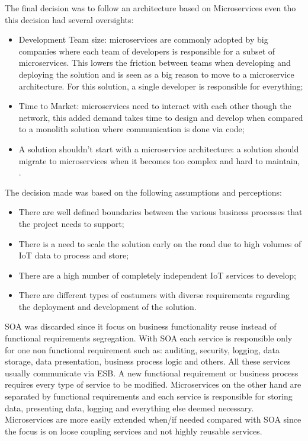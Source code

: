 The final decision was to follow an architecture based on Microservices even tho this decision had several oversights:

\begin{itemize}
   \item Development Team size: microservices are commonly adopted by big companies where each team of developers is responsible for a subset of microservices. This lowers the friction between teams when developing and deploying the solution and is seen as a big reason to move to a microservice architecture. For this solution, a single developer is responsible for everything;
   \item Time to Market: microservices need to interact with each other though the network, this added demand takes time to design and develop when compared to a monolith solution where communication is done via code;
   \item A solution shouldn't start with a microservice architecture: a solution should migrate to microservices when it becomes too complex and hard to maintain, \cite{ibmmicro}. 
\end{itemize}

The decision made was based on the following assumptions and perceptions:

\begin{itemize}
   \item There are well defined boundaries between the various business processes that the project needs to support;
   \item There is a need to scale the solution early on the road due to high volumes of \gls{IoT} data to process and store;
   \item There are a high number of completely independent \gls{IoT} services to develop;
   \item There are different types of costumers with diverse requirements regarding the deployment and development of the solution.
\end{itemize}

\gls{SOA} was discarded since it focus on business functionality reuse instead of functional requirements segregation. With \gls{SOA} each service is responsible only for one non functional requirement such as: auditing, security, logging, data storage, data presentation, business process logic and others. All these services usually communicate via \gls{ESB}. A new functional requirement or business process requires every type of service to be modified. Microservices on the other hand are separated by functional requirements and each service is responsible for storing data, presenting data, logging and everything else deemed necessary. Microservices are more easily extended when/if needed compared with \gls{SOA} since the focus is on loose coupling services and not highly reusable services.

